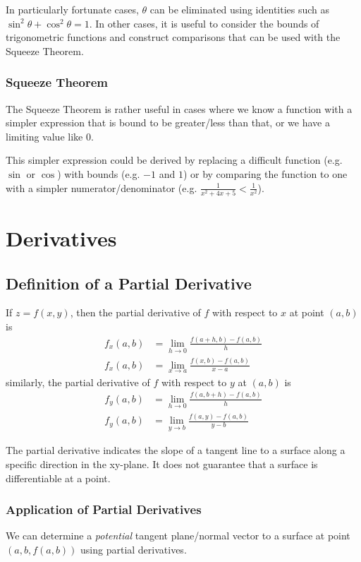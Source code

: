 \documentclass{article}
\begin{document}
In particularly fortunate cases, $\theta$ can be eliminated using identities such as $\sin^2{\theta}+\cos^2{\theta}=1$. In other cases, it is useful to consider the bounds of trigonometric functions and construct comparisons that can be used with the Squeeze Theorem.

\subsubsection{Squeeze Theorem}
The Squeeze Theorem is rather useful in cases where we know a function with a simpler expression that is bound to be greater/less than that, or we have a limiting value like $0$.

This simpler expression could be derived by replacing a difficult function (e.g. $\sin$ or $\cos$) with bounds (e.g. $-1$ and $1$) or by comparing the function to one with a simpler numerator/denominator (e.g. $\frac{1}{x^2+4x+5} < \frac{1}{x^2}$).

\section{Derivatives}
\subsection{Definition of a Partial Derivative}
If $z=f(x,y)$, then the partial derivative of $f$ with respect to $x$ at point $(a,b)$ is
\begin{align*}
    f_x(a,b) &= \lim_{h\to0} \frac{f(a+h,b) - f(a,b)}{h} \\
    f_x(a,b) &= \lim_{x \to a} \frac{f(x,b)-f(a,b)}{x-a}
\end{align*}
similarly, the partial derivative of $f$ with respect to $y$ at $(a,b)$ is
\begin{align*}
    f_y(a,b) &= \lim_{h\to0} \frac{f(a,b+h) - f(a,b)}{h} \\
    f_y(a,b) &= \lim_{y \to b} \frac{f(a,y)-f(a,b)}{y-b}
\end{align*}

The partial derivative indicates the slope of a tangent line to a surface along a specific direction in the xy-plane. It does not guarantee that a surface is differentiable at a point.

\subsubsection{Application of Partial Derivatives} \label{partials-to-tangent}
We can determine a \emph{potential} tangent plane/normal vector to a surface at point $(a,b, f(a,b))$ using partial derivatives.
\end{document}
